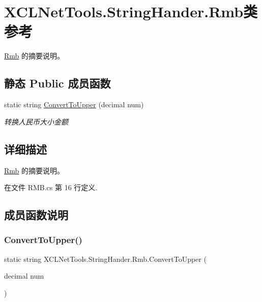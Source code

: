 \hypertarget{class_x_c_l_net_tools_1_1_string_hander_1_1_rmb}{}\section{X\+C\+L\+Net\+Tools.\+String\+Hander.\+Rmb类 参考}
\label{class_x_c_l_net_tools_1_1_string_hander_1_1_rmb}


\hyperlink{class_x_c_l_net_tools_1_1_string_hander_1_1_rmb}{Rmb} 的摘要说明。  


\subsection*{静态 Public 成员函数}
\begin{DoxyCompactItemize}
\item 
static string \hyperlink{class_x_c_l_net_tools_1_1_string_hander_1_1_rmb_a6858f394a291742b58be6b0eda30e94a}{Convert\+To\+Upper} (decimal num)
\begin{DoxyCompactList}\small\item\em 转换人民币大小金额 \end{DoxyCompactList}\end{DoxyCompactItemize}


\subsection{详细描述}
\hyperlink{class_x_c_l_net_tools_1_1_string_hander_1_1_rmb}{Rmb} 的摘要说明。 



在文件 R\+M\+B.\+cs 第 16 行定义.



\subsection{成员函数说明}
\mbox{\label{class_x_c_l_net_tools_1_1_string_hander_1_1_rmb_a6858f394a291742b58be6b0eda30e94a}} 
\subsubsection{\texorpdfstring{Convert\+To\+Upper()}{ConvertToUpper()}}
{\footnotesize\ttfamily static string X\+C\+L\+Net\+Tools.\+String\+Hander.\+Rmb.\+Convert\+To\+Upper (\begin{DoxyParamCaption}\item[{decimal}]{num }\end{DoxyParamCaption})\hspace{0.3cm}{\ttfamily [static]}}




